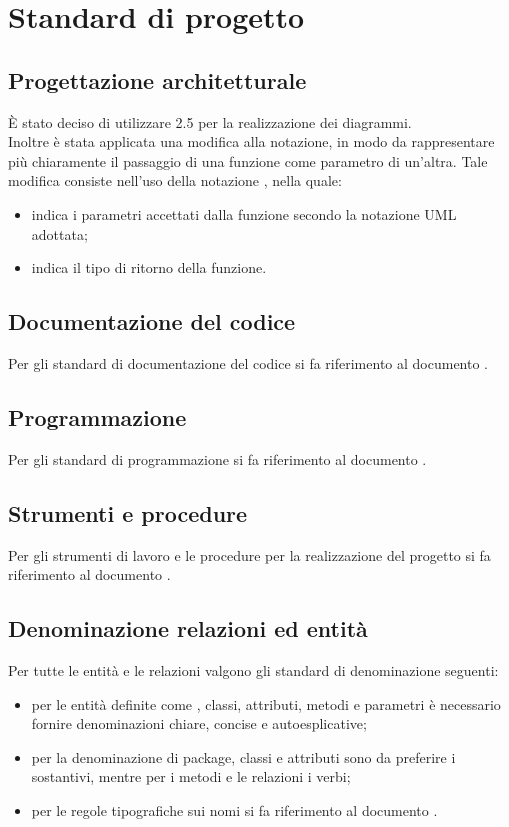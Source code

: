 \section{Standard di progetto}
\subsection{Progettazione architetturale}
È stato deciso di utilizzare  2.5 per la realizzazione dei diagrammi. \\
Inoltre è stata applicata una modifica alla notazione, in modo da rappresentare più chiaramente il passaggio di una funzione come parametro di un'altra.
Tale modifica consiste nell’uso della notazione , nella quale:
\begin{itemize}
	\item {} indica i parametri accettati dalla funzione secondo la notazione UML adottata;
	\item {} indica il tipo di ritorno della funzione.
\end{itemize}
\subsection{Documentazione del codice}
Per gli standard di documentazione del codice si fa riferimento al documento \NPdoc.
\subsection{Programmazione}
Per gli standard di programmazione si fa riferimento al documento \NPdoc.
\subsection{Strumenti e procedure}
Per gli strumenti di lavoro e le procedure per la realizzazione del progetto si fa riferimento al documento \NPdoc.
\subsection{Denominazione relazioni ed entità}
Per tutte le entità e le relazioni valgono gli standard di denominazione seguenti:
\begin{itemize}
	\item per le entità definite come , classi, attributi, metodi e parametri è necessario fornire denominazioni chiare, concise e autoesplicative;
	\item per la denominazione di package, classi e attributi sono da preferire i sostantivi, mentre per i metodi e le relazioni i verbi;
	\item per le regole tipografiche sui nomi si fa riferimento al documento \NPdoc.
\end{itemize}
